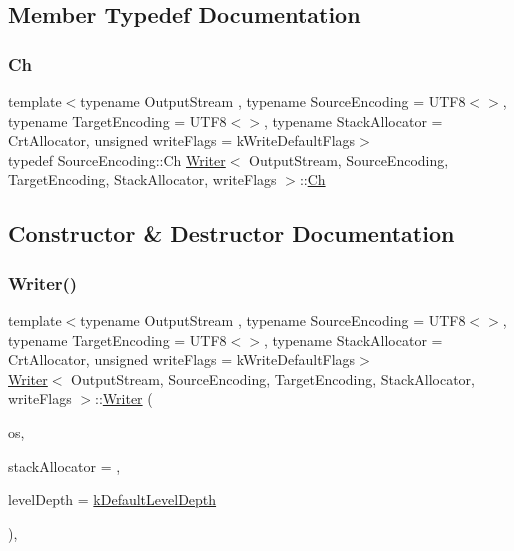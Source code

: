 \subsection{Member Typedef Documentation}
\mbox{\label{classWriter_ab08bff5fd2daec65f4a78779ca3d2139}} 
\subsubsection{\texorpdfstring{Ch}{Ch}}
{\footnotesize\ttfamily template$<$typename Output\+Stream , typename Source\+Encoding  = U\+T\+F8$<$$>$, typename Target\+Encoding  = U\+T\+F8$<$$>$, typename Stack\+Allocator  = Crt\+Allocator, unsigned write\+Flags = k\+Write\+Default\+Flags$>$ \\
typedef Source\+Encoding\+::\+Ch \hyperlink{classWriter}{Writer}$<$ Output\+Stream, Source\+Encoding, Target\+Encoding, Stack\+Allocator, write\+Flags $>$\+::\hyperlink{classWriter_ab08bff5fd2daec65f4a78779ca3d2139}{Ch}}



\subsection{Constructor \& Destructor Documentation}
\mbox{\label{classWriter_af4f54830d6927d9daf5bd53bfd134dd3}} 
\subsubsection{\texorpdfstring{Writer()}{Writer()}\hspace{0.1cm}{\footnotesize\ttfamily [1/3]}}
{\footnotesize\ttfamily template$<$typename Output\+Stream , typename Source\+Encoding  = U\+T\+F8$<$$>$, typename Target\+Encoding  = U\+T\+F8$<$$>$, typename Stack\+Allocator  = Crt\+Allocator, unsigned write\+Flags = k\+Write\+Default\+Flags$>$ \\
\hyperlink{classWriter}{Writer}$<$ Output\+Stream, Source\+Encoding, Target\+Encoding, Stack\+Allocator, write\+Flags $>$\+::\hyperlink{classWriter}{Writer} (\begin{DoxyParamCaption}\item[{Output\+Stream \&}]{os,  }\item[{Stack\+Allocator $\ast$}]{stack\+Allocator = {},  }\item[{size\+\_\+t}]{level\+Depth = {\ttfamily \hyperlink{classWriter_a9cb4caeb9d8971f305edff1d70e67acb}{k\+Default\+Level\+Depth}} }\end{DoxyParamCaption})\hspace{0.3cm}{\ttfamily [inline]}, {\ttfamily [explicit]}}



